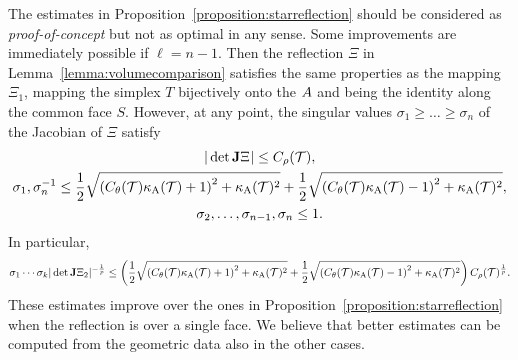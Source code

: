 \documentclass[10pt,a4paper]{article}
\begin{document}
\begin{remark}\label{remark:improved_starreflection}
    The estimates in Proposition~\ref{proposition:starreflection} should be considered as \emph{proof-of-concept} but not as optimal in any sense.
    Some improvements are immediately possible if $\ell=n-1$. 
    Then the reflection $\Xi$ in Lemma~\ref{lemma:volumecomparison} satisfies the same properties as the mapping $\Xi_{1}$,
    mapping the simplex $T$ bijectively onto the $A$ and being the identity along the common face $S$.
    However, at any point, the singular values $\sigma_1 \geq \dots \geq \sigma_n$ of the Jacobian of $\Xi$ satisfy 
    \begin{gather*} 
        | \det{\mathbf{J}}\Xi^{  } |      \leq C_\rho({\mathcal T}),
        \\
        \sigma_{1}, \sigma_{n}^{-1}
        \leq 
        \frac{1}{2} 
        \sqrt{ \left( C_\theta({\mathcal T}) \kappa_{\rm A}({\mathcal T}) + 1 \right)^{2} + \kappa_{\rm A}({\mathcal T})^{2} }
        +
        \frac{1}{2} 
        \sqrt{ \left( C_\theta({\mathcal T}) \kappa_{\rm A}({\mathcal T}) - 1 \right)^{2} + \kappa_{\rm A}({\mathcal T})^{2} }
        ,
        \\
        \sigma_2,\dots,\sigma_{n-1},\sigma_{n} \leq 1.
    \end{gather*}
    In particular,
    \begin{align*}
        \sigma_{1}\cdots\sigma_{k} | \det{\mathbf{J}}\Xi_{2} |^{-\frac 1 p}
        \leq 
        \left( 
            \frac{1}{2} 
            \sqrt{ \left( C_\theta({\mathcal T}) \kappa_{\rm A}({\mathcal T}) + 1 \right)^{2} + \kappa_{\rm A}({\mathcal T})^{2} }
            +
            \frac{1}{2} 
            \sqrt{ \left( C_\theta({\mathcal T}) \kappa_{\rm A}({\mathcal T}) - 1 \right)^{2} + \kappa_{\rm A}({\mathcal T})^{2} }
        \right)
        C_\rho({\mathcal T})^{\frac 1 p}
        .
    \end{align*}
    These estimates improve over the ones in Proposition~\ref{proposition:starreflection} when the reflection is over a single face.
    We believe that better estimates can be computed from the geometric data also in the other cases.
\end{remark}
\end{document}
